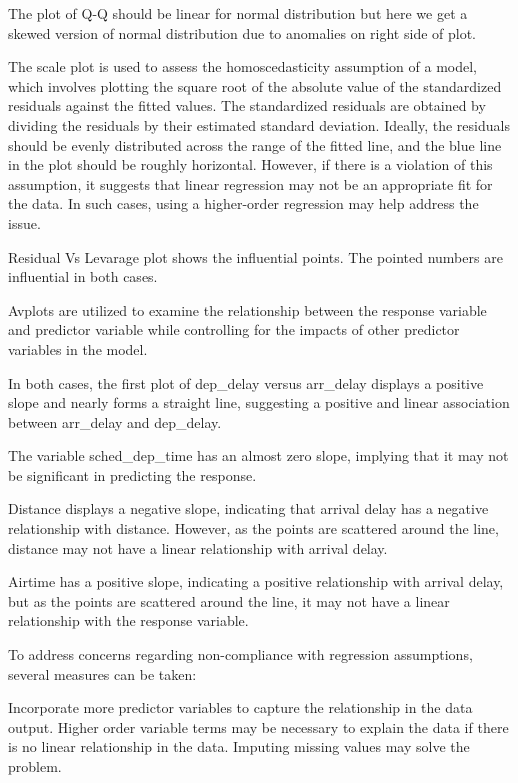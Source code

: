 \documentclass[
]{article}
\begin{document}
The plot of Q-Q should be linear for normal distribution but here we get
a skewed version of normal distribution due to anomalies on right side
of plot.

The scale plot is used to assess the homoscedasticity assumption of a
model, which involves plotting the square root of the absolute value of
the standardized residuals against the fitted values. The standardized
residuals are obtained by dividing the residuals by their estimated
standard deviation. Ideally, the residuals should be evenly distributed
across the range of the fitted line, and the blue line in the plot
should be roughly horizontal. However, if there is a violation of this
assumption, it suggests that linear regression may not be an appropriate
fit for the data. In such cases, using a higher-order regression may
help address the issue.

Residual Vs Levarage plot shows the influential points. The pointed
numbers are influential in both cases.

Avplots are utilized to examine the relationship between the response
variable and predictor variable while controlling for the impacts of
other predictor variables in the model.

In both cases, the first plot of dep\_delay versus arr\_delay displays a
positive slope and nearly forms a straight line, suggesting a positive
and linear association between arr\_delay and dep\_delay.

The variable sched\_dep\_time has an almost zero slope, implying that it
may not be significant in predicting the response.

Distance displays a negative slope, indicating that arrival delay has a
negative relationship with distance. However, as the points are
scattered around the line, distance may not have a linear relationship
with arrival delay.

Airtime has a positive slope, indicating a positive relationship with
arrival delay, but as the points are scattered around the line, it may
not have a linear relationship with the response variable.

To address concerns regarding non-compliance with regression
assumptions, several measures can be taken:

Incorporate more predictor variables to capture the relationship in the
data output. Higher order variable terms may be necessary to explain the
data if there is no linear relationship in the data. Imputing missing
values may solve the problem.
\end{document}
